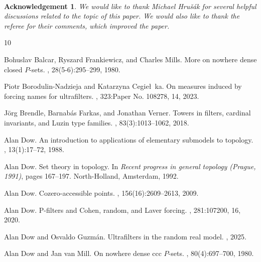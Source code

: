 \documentclass{article}%
\newtheorem{acknowledgement}[theorem]{Acknowledgement}
\begin{document}
\qquad\ \ \qquad\ \ \ \qquad\ \qquad\ \ \ \ \ \qquad\ \ \ \ 

\begin{acknowledgement}
We would like to thank Michael Hru\v{s}\'{a}k for several helpful discussions
related to the topic of this paper. We would also like to thank the referee
for their comments, which improved the paper.
\end{acknowledgement}



\def\cprime{$'$}
\begin{thebibliography}{10}

Bohuslav Balcar, Ryszard Frankiewicz, and Charles Mills.
\newblock More on nowhere dense closed {$P$}-sets.
, 28(5-6):295--299,
  1980.

Piotr Borodulin-Nadzieja and Katarzyna Cegie\l~ka.
\newblock On measures induced by forcing names for ultrafilters.
, 323:Paper No. 108278, 14, 2023.

J\"org Brendle, Barnab\'as Farkas, and Jonathan Verner.
\newblock Towers in filters, cardinal invariants, and {L}uzin type families.
, 83(3):1013--1062, 2018.

Alan Dow.
\newblock An introduction to applications of elementary submodels to topology.
, 13(1):17--72, 1988.

Alan Dow.
\newblock Set theory in topology.
\newblock In {\em Recent progress in general topology ({P}rague, 1991)}, pages
  167--197. North-Holland, Amsterdam, 1992.

Alan Dow.
\newblock Cozero-accessible points.
, 156(16):2609--2613, 2009.

Alan Dow.
\newblock P-filters and {C}ohen, random, and {L}aver forcing.
, 281:107200, 16, 2020.

Alan Dow and Osvaldo Guzmán.
\newblock Ultrafilters in the random real model.
, 2025.

Alan Dow and Jan van Mill.
\newblock On nowhere dense ccc {$P$}-sets.
, 80(4):697--700, 1980.


\end{thebibliography}
\end{document}
